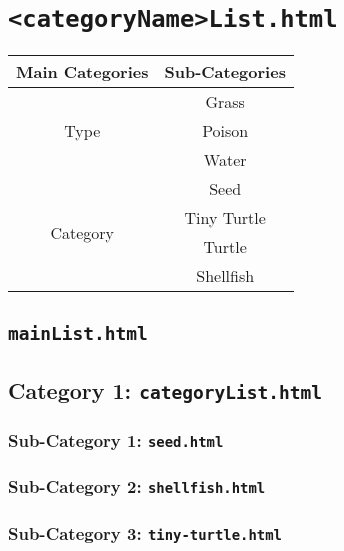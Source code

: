 \section{\texttt{<categoryName>List.html}}

\begin{tabular}{|c|c|}
    \hline
    \textbf{Main Categories} & \textbf{Sub-Categories}\\
    \hline
    \multirow{3}{*}{Type} & Grass \\
    \cline{2-2}
    & Poison \\
    \cline{2-2}
    & Water \\
    \hline
    \multirow{4}{*}{Category} & Seed \\
    \cline{2-2}
    & Tiny Turtle \\
    \cline{2-2}
    & Turtle \\
    \cline{2-2}
    & Shellfish \\
    \hline
\end{tabular}

\subsection{\texttt{mainList.html}}


\newpage
\subsection{Category 1: \texttt{categoryList.html}}


\newpage
\subsubsection{Sub-Category 1: \texttt{seed.html}}

\newpage
\subsubsection{Sub-Category 2: \texttt{shellfish.html}}

\newpage
\subsubsection{Sub-Category 3: \texttt{tiny-turtle.html}}

\newpage
